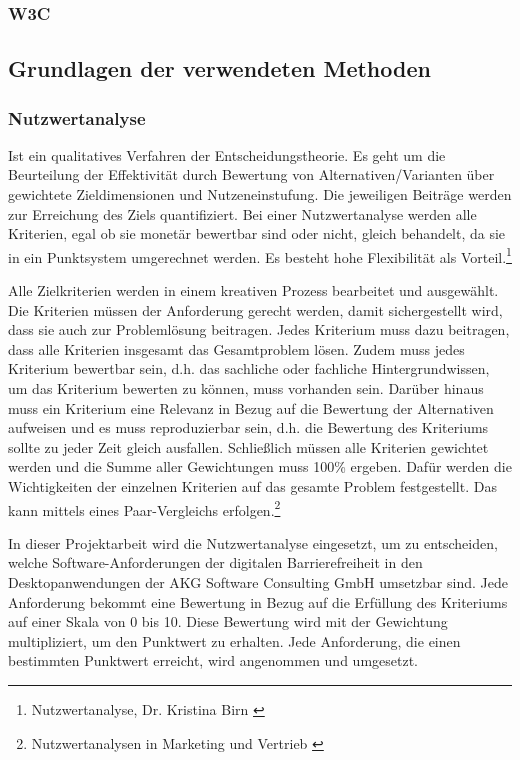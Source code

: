 \subsubsection{\ac{W3C}}

\subsection{Grundlagen der verwendeten Methoden}

\subsubsection{Nutzwertanalyse}

Ist ein qualitatives Verfahren der Entscheidungstheorie. Es geht um die Beurteilung der Effektivität durch Bewertung von Alternativen/Varianten über gewichtete Zieldimensionen und Nutzeneinstufung. Die jeweiligen Beiträge werden zur Erreichung des Ziels quantifiziert. Bei einer Nutzwertanalyse werden alle Kriterien, egal ob sie monetär bewertbar sind oder nicht, gleich behandelt, da sie in ein Punktsystem umgerechnet werden. Es besteht hohe Flexibilität als Vorteil.\footnote{Nutzwertanalyse, Dr. Kristina Birn \cite{Dr.KB-Projektmanagment}}

Alle Zielkriterien werden in einem kreativen Prozess bearbeitet und ausgewählt. Die Kriterien müssen der Anforderung gerecht werden, damit sichergestellt wird, dass sie auch zur Problemlösung beitragen. Jedes Kriterium muss dazu beitragen, dass alle Kriterien insgesamt das Gesamtproblem lösen. Zudem muss jedes Kriterium bewertbar sein, d.h. das sachliche oder fachliche Hintergrundwissen, um das Kriterium bewerten zu können, muss vorhanden sein. Darüber hinaus muss ein Kriterium eine Relevanz in Bezug auf die Bewertung der Alternativen aufweisen und es muss reproduzierbar sein, d.h. die Bewertung des Kriteriums sollte zu jeder Zeit gleich ausfallen. Schließlich müssen alle Kriterien gewichtet werden und die Summe aller Gewichtungen muss 100\% ergeben. Dafür werden die Wichtigkeiten der einzelnen Kriterien auf das gesamte Problem festgestellt. Das kann mittels eines Paar-Vergleichs erfolgen.\footnote{Nutzwertanalysen in Marketing und Vertrieb \cite{kuhnapfel2014nutzwertanalysen}}

In dieser Projektarbeit wird die Nutzwertanalyse eingesetzt, um zu entscheiden, welche Software-Anforderungen der digitalen Barrierefreiheit in den Desktopanwendungen der AKG Software Consulting GmbH umsetzbar sind. Jede Anforderung bekommt eine Bewertung in Bezug auf die Erfüllung des Kriteriums auf einer Skala von 0 bis 10. Diese Bewertung wird mit der Gewichtung multipliziert, um den Punktwert zu erhalten. Jede Anforderung, die einen bestimmten Punktwert erreicht, wird angenommen und umgesetzt. 

